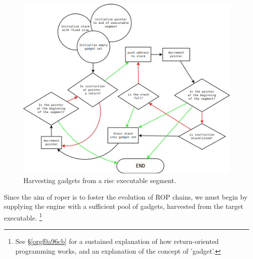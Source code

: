 \documentclass[12pt,glossary]{dalthesis}
\begin{document}
\begin{figure}[htbp]
\centering
\includegraphics[width=.9\linewidth]{../images/gadget-harvest-dark.png}
\caption{\label{fig:org2c0fa2e}
Harvesting gadgets from a \gls{risc} executable segment.}
\end{figure}

Since the aim of \gls{roper} is to foster the evolution of ROP chains, we 
must begin by supplying the engine with a sufficient pool of gadgets, 
harvested from the target executable. 
  \footnote{See \S \ref{orgf0a96cb} for a sustained explanation of how return-oriented
  programming works, and an explanation of the concept of 'gadget'.}
\end{document}
